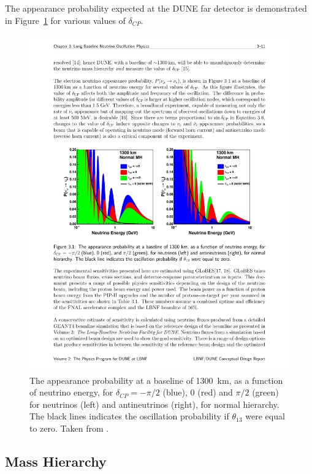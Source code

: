 The appearance probability expected at the DUNE far detector is demonstrated in Figure~\ref{fig:DUNEAppearanceProbabilities} for various values of $\delta_{CP}$.  

\begin{figure}
  \centering
  \includegraphics[width=16cm]{DUNEAppearanceProbabilities.pdf}
  \caption{The appearance probability at a baseline of 1300~km, as a function of neutrino energy, for $\delta_{CP}=-\pi/2$ (blue), 0 (red) and $\pi/2$ (green) for neutrinos (left) and antineutrinos (right), for normal hierarchy.  The black lines indicates the oscillation probability if $\theta_{13}$ were equal to zero.  Taken from \cite{DUNECDR2}.}
  \label{fig:DUNEAppearanceProbabilities}
\end{figure}

\subsection{Mass Hierarchy}

